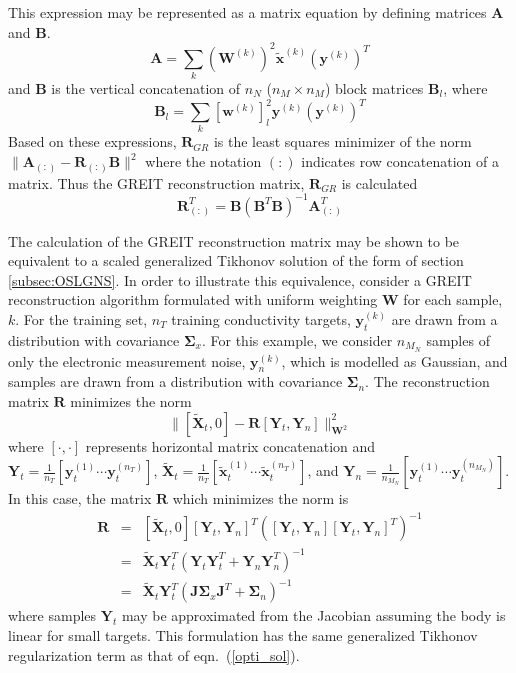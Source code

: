 \documentclass[12pt]{iopart}
\newcommand{\xT}{\mbox{$\mathbf{\tilde x}$}}
\newcommand{\XT}{\mbox{$\mathbf{\tilde X}$}}
\newcommand{\yB}{\mbox{$\mathbf{y}$}}
\newcommand{\wB}{\mbox{$\mathbf{w}$}}
\newcommand{\AB}{\mbox{$\mathbf{A}$}}
\newcommand{\BB}{\mbox{$\mathbf{B}$}}
\newcommand{\RB}{\mbox{$\mathbf{R}$}}
\newcommand{\JB}{\mbox{$\mathbf{J}$}}
\newcommand{\WB}{\mbox{$\mathbf{W}$}}
\newcommand{\YB}{\mbox{$\mathbf{Y}$}}
\newcommand{\SG}{\mbox{${\boldsymbol \Sigma}$}}
\begin{document}
This expression may be represented as a matrix equation
by defining matrices $\AB$ and $\BB$.
\begin{equation}
\AB = \sum_k (\WB^{(k)})^2 \xT^{(k)} (\yB^{(k)})^T 
\end{equation}
and $\BB$ is the vertical concatenation of $n_N$
($n_M \times n_M$) block matrices $\BB_l$, where
\begin{equation}
\BB_l = \sum_k [\wB^{(k)}]_l^2 \yB^{(k)} (\yB^{(k)})^T 
\end{equation}
Based on these expressions, $\RB_{GR}$ is the
least squares minimizer of the norm 
$\|\AB_{(:)} - \RB_{(:)} \BB\|^2$ where
the notation $(:)$ indicates row concatenation of a matrix.
Thus the GREIT reconstruction matrix, $\RB_{GR}$
is calculated
\begin{equation}
\RB_{(:)}^T = \BB (\BB^T \BB)^{-1} \AB_{(:)}^T
\end{equation}

The calculation of the GREIT reconstruction matrix
may be shown to be equivalent to a scaled generalized
Tikhonov solution of the form of section \ref{subsec:OSLGNS}.
In order to illustrate this equivalence, consider
a GREIT reconstruction algorithm formulated
with uniform weighting $\WB$ for each sample, $k$. For the training set,
$n_T$ training conductivity targets, $\yB_t^{(k)}$ are drawn from
a distribution with covariance $\SG_x$.
For this example, we consider $n_{M_N}$ samples of only the electronic
measurement noise, $\yB_n^{(k)}$, which is modelled as Gaussian,
and samples are drawn from a distribution with 
covariance $\SG_n$. The reconstruction matrix $\RB$ minimizes
the norm
\begin{equation}
\| [ \XT_t, 0 ] - \RB [ \YB_t, \YB_n ] \|_{\WB^2}^2
\end{equation}
where $[\cdot,\cdot]$ represents horizontal
matrix concatenation and
$\YB_t = \frac{1}{n_T}    [ \yB_t^{(1)} \cdots \yB_t^{(n_T)} ]$,
$\XT_t = \frac{1}{n_T}    [ \xT_t^{(1)} \cdots \xT_t^{(n_T)} ]$,
and 
$\YB_n = \frac{1}{n_{M_N}} [ \yB_t^{(1)} \cdots \yB_t^{(n_{M_N})} ]$.
In this case, the matrix $\RB$ which minimizes the norm is 
\begin{eqnarray}
\RB &=& [ \XT_t, 0 ] [\YB_t, \YB_n]^T
     \left( [\YB_t, \YB_n] [\YB_t, \YB_n]^T \right)^{-1}
\nonumber \\
    &=& \XT_t \YB_t^T \left( \YB_t \YB_t^T + \YB_n \YB_n^T \right)^{-1}
\nonumber \\
    &=& \XT_t \YB_t^T \left( \JB \SG_x \JB^T + \SG_n \right)^{-1}
\end{eqnarray}
where samples $\YB_t$ may be approximated from the Jacobian
assuming the body is linear for small targets. This formulation 
has the same generalized Tikhonov regularization 
term as that 
of eqn.\ (\ref{opti_sol}).
\end{document}

